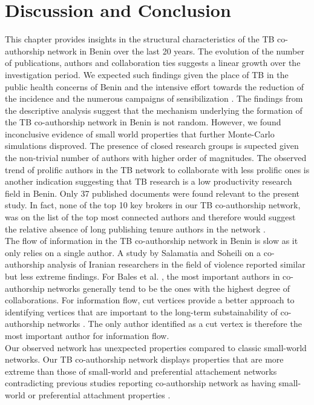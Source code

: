 \section{Discussion and Conclusion}
\label{sec:tb_discussion}
This chapter provides insights in the structural characteristics of the TB co-authorship network in Benin over the last 20 years. The evolution of the number of publications, authors and collaboration ties suggests a linear growth over the investigation period. We expected such findings given the place of TB in the public health concerns of Benin and the intensive effort towards the reduction of the incidence and the numerous campaigns of sensibilization \cite{world_health_organization_atlas_2016}. The findings from the descriptive analysis suggest that the mechanism underlying the formation of the TB co-authorship network in Benin is not random. However, we found inconclusive evidence of small world properties that further Monte-Carlo simulations disproved. The presence of closed research groups is supected given the non-trivial number of authors with higher order of magnitudes. The observed trend of prolific authors in the TB network to collaborate with less prolific ones is another indication suggesting that TB research is a low productivity research field in Benin. Only 37 published documents were found relevant to the present study. In fact, none of the top 10 key brokers in our TB co-authorship network, was on the list of the top most connected authors and therefore would suggest the relative absence of long publishing tenure authors in the network \cite{li_co-authorship_2013}. \\
The flow of information in the TB co-authorship network in Benin is slow as it only relies on a single author. A study by Salamatia and Soheili \cite{salamati_social_2016} on a co-authorship analysis of Iranian researchers in the field of violence reported similar but less extreme findings. For Bales et al. \cite{bales_social_2008,bales_evolution_2011}, the most important authors in co-authorship networks generally tend to be the ones with the highest degree of collaborations. For information flow, cut vertices provide a better approach to identifying vertices that are important to the long-term substainability of co-authorship networks \cite{kolaczyk_statistical_2014}. The only author identified as a cut vertex is therefore the most important author for information flow.\\
Our observed network has unexpected properties compared to classic small-world networks. Our TB co-authorship network displays properties that are more extreme than those of small-world and preferential attachement networks contradicting previous studies reporting co-authorship network as having small-world or preferential attachment properties \cite{gonzalez-alcaide_scientific_2012,wagner_network_2005}.\\
